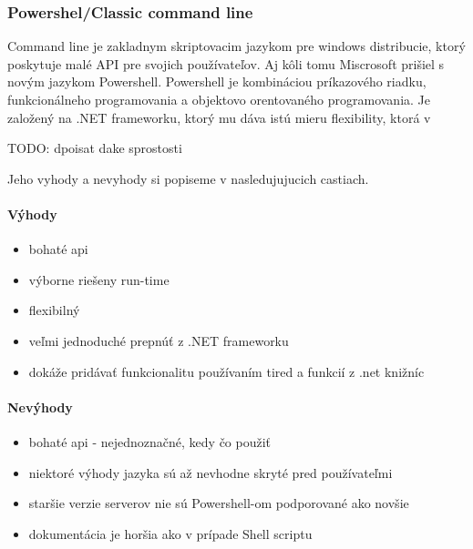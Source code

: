 \subsubsection{Powershel/Classic command line}
\indent  
Command line je zakladnym skriptovacim jazykom pre windows distribucie, ktorý poskytuje malé API  pre svojich používateľov. Aj kôli tomu Miscrosoft prišiel s novým jazykom Powershell. Powershell je kombináciou príkazového riadku, funkcionálneho programovania a objektovo orentovaného programovania. Je založený na .NET frameworku, ktorý mu dáva istú mieru flexibility, ktorá v 

TODO: dpoisat dake sprostosti

Jeho vyhody a nevyhody si popiseme v nasledujujucich castiach.

\paragraph{Výhody}
\begin{itemize}
	\item bohaté api
	\item výborne riešeny run-time 
	\item flexibilný
	\item veľmi jednoduché prepnúť z .NET frameworku
	\item dokáže pridávať funkcionalitu používaním tired a funkcií z .net knižníc
	\newline 
\end{itemize}
\paragraph{Nevýhody}
\begin{itemize}
	\item bohaté api - nejednoznačné, kedy čo použiť
	\item niektoré výhody jazyka sú až nevhodne skryté pred používateľmi
	\item staršie verzie serverov nie sú Powershell-om podporované ako novšie
	\item dokumentácia je horšia ako v prípade Shell scriptu
	\newline
\end{itemize}

